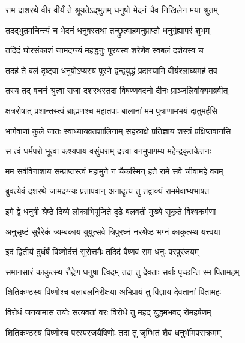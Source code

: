 
\twolineshloka
{राम दाशरथे वीर वीर्यं ते श्रूयतेऽद्भुतम्}
{धनुषो भेदनं चैव निखिलेन मया श्रुतम्} %

\twolineshloka
{तदद्भुतमचिन्त्यं च भेदनं धनुषस्तथा}
{तच्छ्रुत्वाहमनुप्राप्तो धनुर्गृह्यापरं शुभम्} %

\twolineshloka
{तदिदं घोरसंकाशं जामदग्न्यं महद्धनुः}
{पूरयस्व शरेणैव स्वबलं दर्शयस्व च} %

\twolineshloka
{तदहं ते बलं दृष्ट्वा धनुषोऽप्यस्य पूरणे}
{द्वन्द्वयुद्धं प्रदास्यामि वीर्यश्लाघ्यमहं तव} %

\twolineshloka
{तस्य तद् वचनं श्रुत्वा राजा दशरथस्तदा}
{विषण्णवदनो दीनः प्राञ्जलिर्वाक्यमब्रवीत्} %

\twolineshloka
{क्षत्ररोषात् प्रशान्तस्त्वं ब्राह्मणश्च महातपाः}
{बालानां मम पुत्राणामभयं दातुमर्हसि} %

\twolineshloka
{भार्गवाणां कुले जातः स्वाध्यायव्रतशालिनाम्}
{सहस्राक्षे प्रतिज्ञाय शस्त्रं प्रक्षिप्तवानसि} %

\twolineshloka
{स त्वं धर्मपरो भूत्वा कश्यपाय वसुंधराम्}
{दत्त्वा वनमुपागम्य महेन्द्रकृतकेतनः} %

\twolineshloka
{मम सर्वविनाशाय सम्प्राप्तस्त्वं महामुने}
{न चैकस्मिन् हते रामे सर्वे जीवामहे वयम्} %

\twolineshloka
{ब्रुवत्येवं दशरथे जामदग्न्यः प्रतापवान्}
{अनादृत्य तु तद्वाक्यं राममेवाभ्यभाषत} %

\twolineshloka
{इमे द्वे धनुषी श्रेष्ठे दिव्ये लोकाभिपूजिते}
{दृढे बलवती मुख्ये सुकृते विश्वकर्मणा} %

\twolineshloka
{अनुसृष्टं सुरैरेकं त्र्यम्बकाय युयुत्सवे}
{त्रिपुरघ्नं नरश्रेष्ठ भग्नं काकुत्स्थ यत्त्वया} %

\twolineshloka
{इदं द्वितीयं दुर्धर्षं विष्णोर्दत्तं सुरोत्तमैः}
{तदिदं वैष्णवं राम धनुः परपुरंजयम्} %

\twolineshloka
{समानसारं काकुत्स्थ रौद्रेण धनुषा त्विदम्}
{तदा तु देवताः सर्वाः पृच्छन्ति स्म पितामहम्} %

\twolineshloka
{शितिकण्ठस्य विष्णोश्च बलाबलनिरीक्षया}
{अभिप्रायं तु विज्ञाय देवतानां पितामहः} %

\twolineshloka
{विरोधं जनयामास तयोः सत्यवतां वरः}
{विरोधे तु महद् युद्धमभवद् रोमहर्षणम्} %

\twolineshloka
{शितिकण्ठस्य विष्णोश्च परस्परजयैषिणोः}
{तदा तु जृम्भितं शैवं धनुर्भीमपराक्रमम्} %

